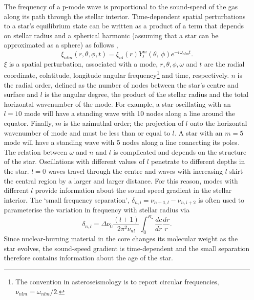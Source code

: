 The frequency of a p-mode wave is proportional to the sound-speed of the gas
along its path through the stellar interior.
Time-dependent spatial perturbations to a star's equilibrium state can be
written as a product of a term that depends on stellar radius and a spherical
harmonic (assuming that a star can be approximated as a sphere) as follows
\citep{brown},
\begin{equation}
    \xi_{nlm}(r, \theta, \phi, t) = \xi_{nl}(r)Y_l^m(\theta, \
    \phi)e^{-i\omega_{nlm}t}.
\end{equation}
$\xi$ is a spatial perturbation, associated with a mode, $r, \theta, \phi,
\omega$ and $t$ are the radial coordinate, colatitude, longitude angular
frequency\footnote{The convention in asteroseismology is to report circular
frequencies, $\nu_{nlm} = \omega_{nlm}/2$.} and time, respectively.
$n$ is the radial order, defined as the number of nodes between the star's
centre and surface and $l$ is the angular degree, the product of the stellar
radius and the total horizontal wavenumber of the mode.
For example, a star oscillating with an $l = 10$ mode will have a standing
wave with 10 nodes along a line around the equator.
Finally, $m$ is the azimuthal order; the projection of $l$ onto the horizontal
wavenumber of mode and must be less than or equal to $l$.
A star with an $m = 5$ mode will have a standing wave with 5 nodes along a
line connecting its poles.
The relation between $\omega$ and $n$ and $l$ is complicated and depends on the
structure of the star.
Oscillations with different values of $l$ penetrate to different depths in the
star.
$l = 0$ waves travel through the centre and waves with increasing $l$ skirt
the central region by a larger and larger distance.
For this reason, modes with different $l$ provide information about the sound
speed gradient in the stellar interior.
The `small frequency separation', $\delta_{n,l} = \nu_{n+1, l} - \nu_{n, l+2}$
is often used to parameterise the variation in frequency with stellar radius
via \citep{brown}
\begin{equation}
    \delta_{n,l} = \Delta\nu_0\frac{(l + 1)}{2\pi^2\nu_{nl}}\int_0^{R_\star}
    \frac{dc}{dr}\frac{dr}{r}.
\end{equation}
Since nuclear-burning material in the core changes its molecular weight as the
star evolves, the sound-speed gradient is time-dependent and the small
separation therefore contains information about the age of the star.

